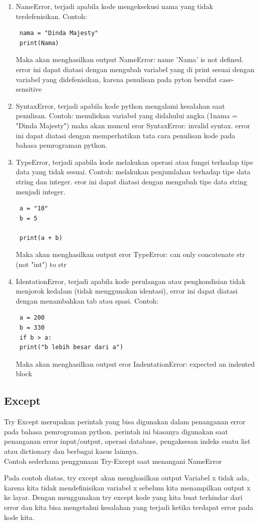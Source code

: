 \begin{enumerate}
 \item NameError, terjadi apabila kode mengeksekusi nama yang tidak terdefenisikan. Contoh:
 \begin{verbatim}
 nama = "Dinda Majesty"
 print(Nama)
 \end{verbatim}
 Maka akan menghasilkan output NameError: name 'Nama' is not defined. error ini dapat diatasi dengan mengubah variabel yang di print sesuai dengan variabel yang didefenisikan, karena penulisan pada pyton bersifat case-sensitive
 
 \item SyntaxError, terjadi apabila kode python mengalami kesalahan saat penulisan. Contoh: menuliskan variabel yang didahului angka (1nama = "Dinda Majesty") maka akan muncul eror SyntaxError: invalid syntax. error ini dapat diatasi dengan memperhatikan tata cara penulisan kode pada bahasa pemrograman python.
 
 \item TypeError, terjadi apabila kode melakukan operasi atau fungsi terhadap tipe data yang tidak sesuai. Contoh: melakukan penjumlahan terhadap tipe data string dan integer. eror ini dapat diatasi dengan mengubah tipe data string menjadi integer.
 \begin{verbatim}
 a = "10"
 b = 5

 print(a + b)
 \end{verbatim}
 Maka akan menghasilkan output eror TypeError: can only concatenate str (not "int") to str
 
 \item IdentationError, terjadi apabila kode perulangan atau pengkondisian tidak menjorok kedalam (tidak menggunakan identasi), error ini dapat diatasi dengan menambahkan tab atau spasi. Contoh:
 \begin{verbatim}
 a = 200
 b = 330
 if b > a:
 print("b lebih besar dari a")
 \end{verbatim}
 Maka akan menghasilkan output eror IndentationError: expected an indented block
\end{enumerate}

\subsection{Except}
Try Except merupakan perintah yang bisa digunakan dalam penanganan error pada bahasa pemrograman python. perintah ini biasanya digunakan saat penanganan error input/output, operasi database, pengaksesan indeks suatu list atau dictionary dan berbagai kasus lainnya.\\
Contoh sederhana penggunaan Try-Except saat menangani NameError

Pada contoh diatas, try except akan menghasilkan output Variabel x tidak ada, karena kita tidak mendefinisikan variabel x sebelum kita menampilkan output x ke layar. Dengan menggunakan try except kode yang kita buat terhindar dari error dan kita bisa mengetahui kesalahan yang terjadi ketika terdapat error pada kode kita.

